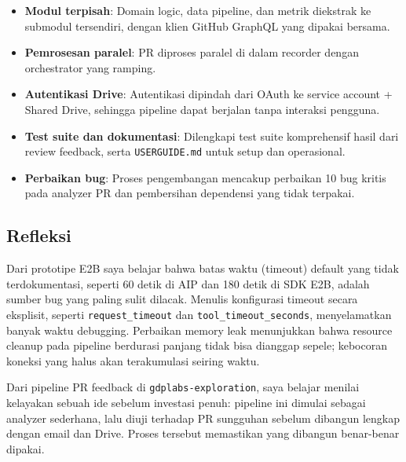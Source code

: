 \begin{itemize}
    \item \textbf{Modul terpisah}: Domain logic, data pipeline, dan metrik diekstrak ke submodul tersendiri, dengan klien GitHub GraphQL yang dipakai bersama.
    \item \textbf{Pemrosesan paralel}: PR diproses paralel di dalam recorder dengan orchestrator yang ramping.
    \item \textbf{Autentikasi Drive}: Autentikasi dipindah dari OAuth ke service account + Shared Drive, sehingga pipeline dapat berjalan tanpa interaksi pengguna.
    \item \textbf{Test suite dan dokumentasi}: Dilengkapi test suite komprehensif hasil dari review feedback, serta \texttt{USERGUIDE.md} untuk setup dan operasional.
    \item \textbf{Perbaikan bug}: Proses pengembangan mencakup perbaikan 10 bug kritis pada analyzer PR dan pembersihan dependensi yang tidak terpakai.
\end{itemize}

\subsection{Refleksi}

Dari prototipe E2B saya belajar bahwa batas waktu (timeout) default yang tidak terdokumentasi, seperti 60 detik di AIP dan 180 detik di SDK E2B, adalah sumber bug yang paling sulit dilacak. Menulis konfigurasi timeout secara eksplisit, seperti \texttt{request\_timeout} dan \texttt{tool\_timeout\_seconds}, menyelamatkan banyak waktu debugging. Perbaikan memory leak menunjukkan bahwa resource cleanup pada pipeline berdurasi panjang tidak bisa dianggap sepele; kebocoran koneksi yang halus akan terakumulasi seiring waktu.

Dari pipeline PR feedback di \texttt{gdplabs-exploration}, saya belajar menilai kelayakan sebuah ide sebelum investasi penuh: pipeline ini dimulai sebagai analyzer sederhana, lalu diuji terhadap PR sungguhan sebelum dibangun lengkap dengan email dan Drive. Proses tersebut memastikan yang dibangun benar-benar dipakai.

\clearpage
